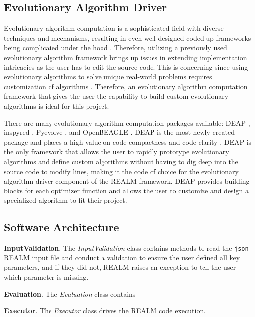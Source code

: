 \subsection{Evolutionary Algorithm Driver}
Evolutionary algorithm computation is a sophisticated field with diverse techniques 
and mechanisms, resulting in even well designed coded-up frameworks being complicated 
under the hood \cite{fortin_deap_2012}. 
Therefore, utilizing a previously used evolutionary algorithm framework brings 
up issues in extending implementation intricacies as the user has to edit the 
source code. 
This is concerning since using evolutionary algorithms to solve unique real-world 
problems requires customization of algorithms \cite{fortin_deap_2012}. 
Therefore, an evolutionary algorithm computation framework that gives the user the 
capability to build custom evolutionary algorithms is ideal for this project.

There are many evolutionary algorithm computation packages available: 
\gls{DEAP} \cite{fortin_deap_2012}, inspyred \cite{garrett_inspyred_2014}, 
Pyevolve \cite{perone_pyevolve_2009}, and OpenBEAGLE \cite{gagne_open_2002}.
\gls{DEAP} is the most newly created package and places a high value on code 
compactness and code clarity \cite{fortin_deap_2012}. 
\gls{DEAP} is the only framework that allows the user to rapidly prototype 
evolutionary algorithms and define custom algorithms without having to dig 
deep into the source code to modify lines,  making it the code of choice for 
the evolutionary algorithm driver component of the \gls{REALM} framework.  
\gls{DEAP} provides building blocks for each optimizer function and allows the 
user to customize and design a specialized algorithm to fit their project.

\subsection{Software Architecture}
\vspace{0.2cm} 
\noindent
\textbf{InputValidation}. The \textit{InputValidation} class contains methods 
to read the \texttt{json} \gls{REALM} input file and conduct a validation to 
ensure the user defined all key parameters, and if they did not, \gls{REALM} 
raises an exception to tell the user which parameter is missing. 

\vspace{0.2cm} 
\noindent
\textbf{Evaluation}. The \textit{Evaluation} class contains 

\vspace{0.2cm} 
\noindent
\textbf{Executor}. The \textit{Executor} class drives the \gls{REALM} code
execution. 
